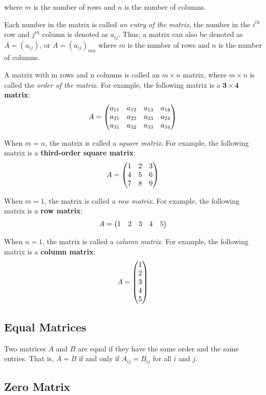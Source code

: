 \documentclass{report}
\begin{document}
\begin{multicols}{2}
  where $m$ is the number of rows and $n$ is the number of columns.

  Each number in the matrix is called \emph{an entry of the matrix}, the number
  in the $i^{th}$ row and $j^{th}$ column is denoted as $a_{ij}$. Thus, a matrix
  can also be denoted as $A = (a_{ij})$, or $A = {(a_{ij})}_{mn}$ where $m$ is
  the number of rows and $n$ is the number of columns.

  A matrix with m rows and n columns is called an $m \times n$ matrix, where $m
    \times n$ is called the \emph{order of the matrix}. For example, the following
  matrix is a \textbf{$\mathbf{3 \times 4}$ matrix}:
  \[
    A = \begin{pmatrix}
      a_{11} & a_{12} & a_{13} & a_{14} \\
      a_{21} & a_{22} & a_{23} & a_{24} \\
      a_{31} & a_{32} & a_{33} & a_{34}
    \end{pmatrix}
  \]

  When $m = n$, the matrix is called a \emph{square matrix}. For example, the
  following matrix is a \textbf{third-order square matrix}:
  \[
    A = \begin{pmatrix}
      1 & 2 & 3 \\
      4 & 5 & 6 \\
      7 & 8 & 9
    \end{pmatrix}
  \]

  When $m = 1$, the matrix is called a \emph{row matrix}. For example, the
  following matrix is a \textbf{row matrix}:
  \[
    A = \begin{pmatrix}
      1 & 2 & 3 & 4 & 5
    \end{pmatrix}
  \]

  When $n = 1$, the matrix is called a \emph{column matrix}. For example, the
  following matrix is a \textbf{column matrix}:
  \[
    A = \begin{pmatrix}
      1 \\
      2 \\
      3 \\
      4 \\
      5
    \end{pmatrix}
  \]

  \singlespacing{}

  \subsection*{Equal Matrices}

  \doublespacing{}

  Two matrices $A$ and $B$ are equal if they have the same order and the same
  entries. That is, $A = B$ if and only if $A_{ij} = B_{ij}$ for all $i$ and $j$.

  \singlespacing{}

  \subsection*{Zero Matrix}


\end{multicols}
\end{document}
